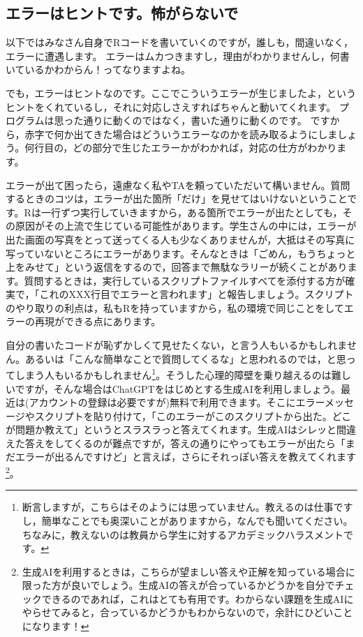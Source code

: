 \documentclass{ltjsbook}
\begin{document}
\subsection{エラーはヒントです。怖がらないで}
\label{DontBeAfraid}
以下ではみなさん自身でRコードを書いていくのですが，誰しも，間違いなく，エラーに遭遇します。
エラーはムカつきますし，理由がわかりませんし，何書いているかわからん！ってなりますよね。

でも，エラーはヒントなのです。ここでこういうエラーが生じましたよ，というヒントをくれているし，それに対応しさえすればちゃんと動いてくれます。
プログラムは思った通りに動くのではなく，書いた通りに動くのです。
ですから，赤字で何か出てきた場合はどういうエラーなのかを読み取るようにしましょう。何行目の，どの部分で生じたエラーかがわかれば，対応の仕方がわかります。

エラーが出て困ったら，遠慮なく私やTAを頼っていただいて構いません。質問するときのコツは，エラーが出た箇所「だけ」を見せてはいけないということです。Rは一行ずつ実行していきますから，ある箇所でエラーが出たとしても，その原因がその上流で生じている可能性があります。学生さんの中には，エラーが出た画面の写真をとって送ってくる人も少なくありませんが，大抵はその写真に写っていないところにエラーがあります。そんなときは「ごめん，もうちょっと上をみせて」という返信をするので，回答まで無駄なラリーが続くことがあります。質問するときは，実行しているスクリプトファイルすべてを添付する方が確実で，「これのXXX行目でエラーと言われます」と報告しましょう。スクリプトのやり取りの利点は，私もRを持っていますから，私の環境で同じことをしてエラーの再現ができる点にあります。

自分の書いたコードが恥ずかしくて見せたくない，と言う人もいるかもしれません。あるいは「こんな簡単なことで質問してくるな」と思われるのでは，と思ってしまう人もいるかもしれません\footnote{断言しますが，こちらはそのようには思っていません。教えるのは仕事ですし，簡単なことでも奥深いことがありますから，なんでも聞いてください。ちなみに，教えないのは教員から学生に対するアカデミックハラスメントです。}。そうした心理的障壁を乗り越えるのは難しいですが，そんな場合はChatGPTをはじめとする生成AIを利用しましょう。最近は(アカウントの登録は必要ですが)無料で利用できます。そこにエラーメッセージやスクリプトを貼り付けて，「このエラーがこのスクリプトから出た。どこが問題か教えて」というとスラスラっと答えてくれます。生成AIはシレッと間違えた答えをしてくるのが難点ですが，答えの通りにやってもエラーが出たら「まだエラーが出るんですけど」と言えば，さらにそれっぽい答えを教えてくれます\footnote{生成AIを利用するときは，こちらが望ましい答えや正解を知っている場合に限った方が良いでしょう。生成AIの答えが合っているかどうかを自分でチェックできるのであれば，これはとても有用です。わからない課題を生成AIにやらせてみると，合っているかどうかもわからないので，余計にひどいことになります！}。
\end{document}
